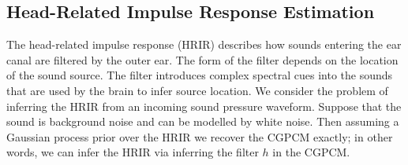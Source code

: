 \documentclass{article}
\newcommand{\cond}{\, | \,}               %
\begin{document}


\subsection{Head-Related Impulse Response Estimation}
The head-related impulse response (HRIR) describes how sounds entering the ear canal are filtered by the outer ear. The form of the filter depends on the location of the sound source. The filter introduces complex spectral cues into the sounds that are used by the brain to infer source location. We consider the problem of inferring the HRIR from an incoming sound pressure waveform. Suppose that the sound is background noise and can be modelled by white noise. Then assuming a Gaussian process prior over the HRIR we recover the CGPCM exactly; in other words, we can infer the HRIR via inferring the filter $h$ in the CGPCM.
\end{document}

